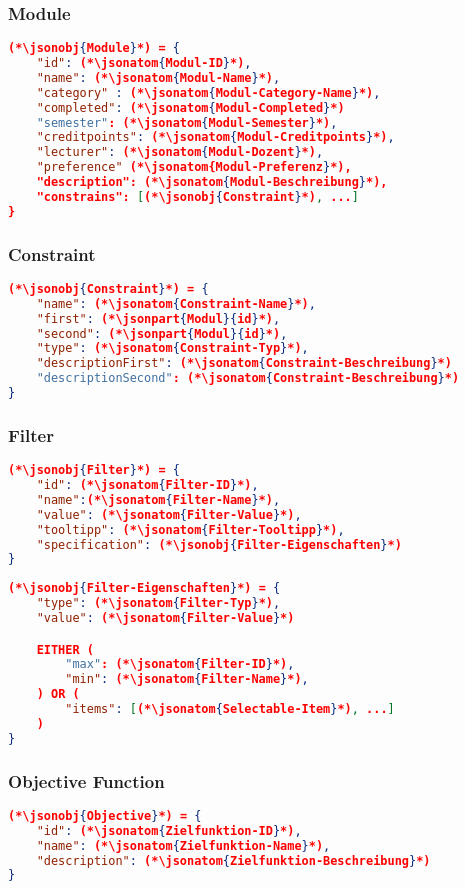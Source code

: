 \subsubsection{Module}
\begin{lstlisting}[language=json,firstnumber=1]
(*\jsonobj{Module}*) = {
	"id": (*\jsonatom{Modul-ID}*),
	"name": (*\jsonatom{Modul-Name}*),
	"category" : (*\jsonatom{Modul-Category-Name}*),
	"completed": (*\jsonatom{Modul-Completed}*)
	"semester": (*\jsonatom{Modul-Semester}*),
	"creditpoints": (*\jsonatom{Modul-Creditpoints}*),
	"lecturer": (*\jsonatom{Modul-Dozent}*),
	"preference" (*\jsonatom{Modul-Preferenz}*),
	"description": (*\jsonatom{Modul-Beschreibung}*),	
	"constrains": [(*\jsonobj{Constraint}*), ...]	
}
\end{lstlisting}

\subsubsection{Constraint}
\begin{lstlisting}[language=json,firstnumber=1]
(*\jsonobj{Constraint}*) = {
	"name": (*\jsonatom{Constraint-Name}*),
	"first": (*\jsonpart{Modul}{id}*),
	"second": (*\jsonpart{Modul}{id}*),
	"type": (*\jsonatom{Constraint-Typ}*),
	"descriptionFirst": (*\jsonatom{Constraint-Beschreibung}*)
	"descriptionSecond": (*\jsonatom{Constraint-Beschreibung}*)	
}
\end{lstlisting}

\subsubsection{Filter}
\begin{lstlisting}[language=json,firstnumber=1]
(*\jsonobj{Filter}*) = {
	"id": (*\jsonatom{Filter-ID}*),
	"name":(*\jsonatom{Filter-Name}*),
	"value": (*\jsonatom{Filter-Value}*),
	"tooltipp": (*\jsonatom{Filter-Tooltipp}*),
	"specification": (*\jsonobj{Filter-Eigenschaften}*)
}
\end{lstlisting}
\begin{lstlisting}[language=json,firstnumber=1]
(*\jsonobj{Filter-Eigenschaften}*) = {
	"type": (*\jsonatom{Filter-Typ}*),
	"value": (*\jsonatom{Filter-Value}*)

	EITHER (
		"max": (*\jsonatom{Filter-ID}*),
		"min": (*\jsonatom{Filter-Name}*),
	) OR (
		"items": [(*\jsonatom{Selectable-Item}*), ...]
	)
}
\end{lstlisting}

\subsubsection{Objective Function}
\begin{lstlisting}[language=json,firstnumber=1]
(*\jsonobj{Objective}*) = {
	"id": (*\jsonatom{Zielfunktion-ID}*),
	"name": (*\jsonatom{Zielfunktion-Name}*),
	"description": (*\jsonatom{Zielfunktion-Beschreibung}*)
}
\end{lstlisting}

